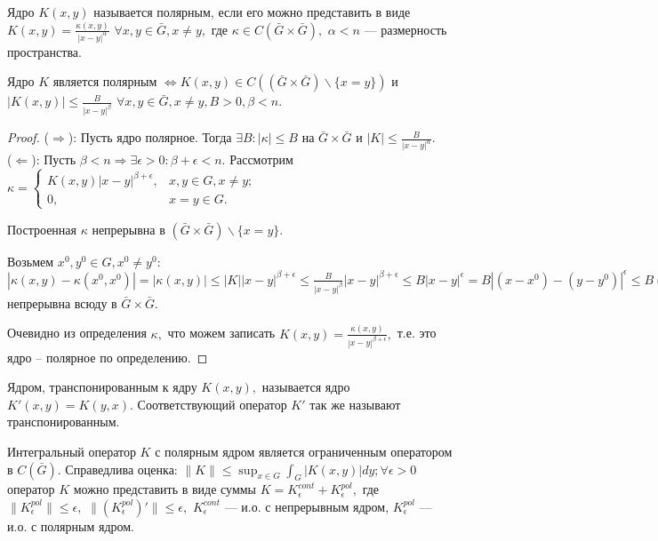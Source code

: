 \begin{definition}
Ядро $K(x,y)$ называется полярным, если его можно представить в виде $K(x,y) = \frac{\kappa(x,y)}{|x-y|^\alpha}$ $\forall x,y \in \bar G, x\ne y,$ где $\kappa \in C(\bar G \times \bar G),$ $\alpha < n$ --- размерность пространства.
\end{definition}

\begin{lemma}
Ядро $K$ является полярным $\Leftrightarrow K(x,y) \in C((\bar G \times \bar G)\backslash\{x=y\})$ и $|K(x,y)| \le \frac{B}{|x-y|^\beta}$ $\forall x, y \in \bar G, x \ne y, B>0, \beta < n.$
\end{lemma}

\begin{proof}
($\Rightarrow$): Пусть ядро полярное. Тогда $\exists B: |\kappa| \le B$ на $\bar G \times \bar G$ и $|K| \le \frac{B}{|x-y|^\alpha}.$
\\
($\Leftarrow$): Пусть $\beta < n \Rightarrow \exists \epsilon > 0: \beta+\epsilon < n.$ Рассмотрим $\kappa =  \begin{cases}
   K(x,y)|x-y|^{\beta+\epsilon}, &x,y\in G, x\ne y;\\
   0, & x=y\in G.
 \end{cases}
$

Построенная $\kappa$ непрерывна в $(\bar G \times \bar G)\backslash\{x=y\}.$

Возьмем $x^0,y^0 \in G, x^0 \ne y^0:$
$|\kappa(x,y) - \kappa(x^0, x^0)| = |\kappa(x,y)| \le |K||x-y|^{\beta+\epsilon} \le \frac{B}{|x-y|^\beta}|x-y|^{\beta+\epsilon}\le B|x-y|^\epsilon = B|(x-x^0)-(y-y^0)|^\epsilon \le B(|x-x^0|+|y-y^0|)^\epsilon \Rightarrow \kappa$ непрерывна всюду в $\bar G \times \bar G.$

Очевидно из определения $\kappa,$ что можем записать $K(x,y) = \frac{\kappa(x,y)}{|x-y|^{\beta+\epsilon}},$ т.е. это ядро -- полярное по определению.
\end{proof}


\begin{definition}
Ядром, транспонированным к ядру $K(x,y),$ называется ядро $K'(x,y) = K(y,x).$ Соответствующий оператор $K'$ так же называют транспонированным.
\end{definition}

\begin{theorem}
Интегральный оператор $K$ с полярным ядром является ограниченным оператором в $C(\bar G).$ Справедлива оценка: $\|K\| \le \sup_{x\in G}\int_G|K(x,y)|dy; \forall \epsilon > 0$ оператор $K$ можно представить в виде суммы $K = K_\epsilon^{cont}+K_\epsilon^{pol},$ где $\|K_\epsilon^{pol}\| \le \epsilon,$ $\|(K_\epsilon^{pol})'\| \le \epsilon,$ $K_\epsilon^{cont}$ --- и.о. с непрерывным ядром, $K_\epsilon^{pol}$ --- и.о. с полярным ядром.
\end{theorem}


